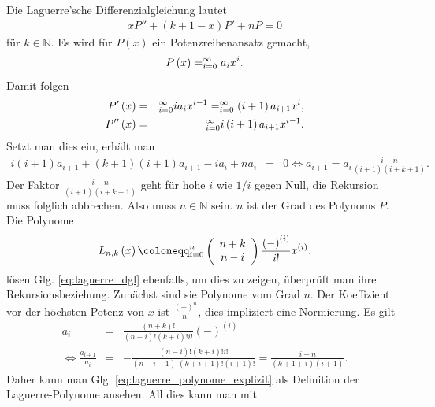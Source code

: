\documentclass{book}
\let\sum\relax
\DeclareMathOperator*{\sum}{\raisebox{-3.5pt}{\scalebox{2}{\rotatebox{1}{{\bask Σ}}}}}
\begin{document}
Die Laguerre'sche Differenzialgleichung lautet
%
\begin{eqnarray}
xP'' + \left(k + 1 - x\right)P' + nP = 0\label{eq:laguerre_dgl}
\end{eqnarray}
%
für $k\in\mathbb{N}$. Es wird für $P\left(x\right)$ ein Potenzreihenansatz gemacht, 
%
\begin{eqnarray}
P\left(x\right) = \sum_{i = 0}^{\infty}a_ix^i.
\end{eqnarray}
%
Damit folgen
%
\begin{eqnarray}
P'\left(x\right) & = & \sum_{i = 0}^{\infty}ia_ix^{i - 1} = \sum_{i = 0}^{\infty}\left(i + 1\right)a_{i + 1}x^i,\\
P''\left(x\right) & = & \sum_{i = 0}^{\infty}i\left(i + 1\right)a_{i + 1}x^{i - 1}.
\end{eqnarray}
%
Setzt man dies ein, erhält man
%
\begin{eqnarray}
i\left(i + 1\right)a_{i + 1} + \left(k + 1\right)\left(i + 1\right)a_{i + 1} - ia_i + na_i & = &0
\Leftrightarrow a_{i + 1} = a_i\frac{i - n}{\left(i + 1\right)\left(i + k + 1\right)}.\label{eq:rek_laguerre}
\end{eqnarray}
%
Der Faktor $\frac{i - n}{\left(i + 1\right)\left(i + k + 1\right)}$ geht für hohe $i$ wie $1/i$ gegen Null, die Rekursion muss folglich abbrechen. Also muss $n\in\mathbb{N}$ sein. $n$ ist der Grad des Polynoms $P$. Die Polynome
%
\begin{eqnarray}
L_{n, k}\left(x\right) \coloneqq \sum_{i = 0}^{n}\left(\begin{array}{c}
n + k\\
n - i
\end{array}\right)\frac{\left(-\right)^{(i)}}{i!}x^{(i)}.\label{eq:laguerre_polynome_explizit}
\end{eqnarray}
%
lösen Glg. \eqref{eq:laguerre_dgl} ebenfalls, um dies zu zeigen, überprüft man ihre Rekursionsbeziehung. Zunächst sind sie Polynome vom Grad $n$. Der Koeffizient vor der höchsten Potenz von $x$ ist $\frac{\left(-\right)^n}{n!}$, dies impliziert eine Normierung. Es gilt
%
\begin{eqnarray}
a_i & = & \frac{\left(n + k\right)!}{\left(n - i\right)!\left(k + i\right)!i!}\left(-\right)^{(i)}\nonumber\\
\Leftrightarrow \frac{a_{i + 1}}{a_i} & = & -\frac{\left(n - i\right)!\left(k + i\right)!i!}{\left(n - i - 1\right)!\left(k + i + 1\right)!\left(i + 1\right)!} = \frac{i - n}{\left(k + 1 + i\right)\left(i + 1\right)}.
\end{eqnarray}
%
Daher kann man Glg. \eqref{eq:laguerre_polynome_explizit} als Definition der Laguerre-Polynome ansehen. All dies kann man mit
\end{document}
